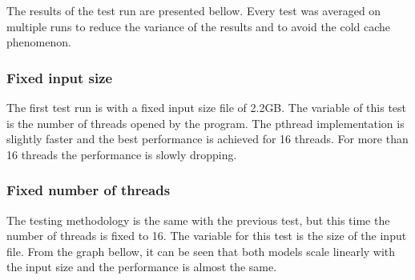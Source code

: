The results of the test run are presented bellow. Every test was averaged on multiple runs to reduce
the variance of the results and to avoid the cold cache phenomenon.

\subsubsection*{Fixed input size}

The first test run is with a fixed input size file of 2.2GB. The variable of this test is the number of threads opened by the program.
The pthread implementation is slightly faster and the best performance is achieved for 16 threads.
For more than 16 threads the performance is slowly dropping.

\begin{center}
\end{center}

\subsubsection*{Fixed number of threads}

The testing methodology is the same with the previous test, but this time the number of threads is
fixed to 16. The variable for this test is the size of the input file. From the graph bellow, it can
be seen that both models scale linearly with the input size and the performance is almost the same.

